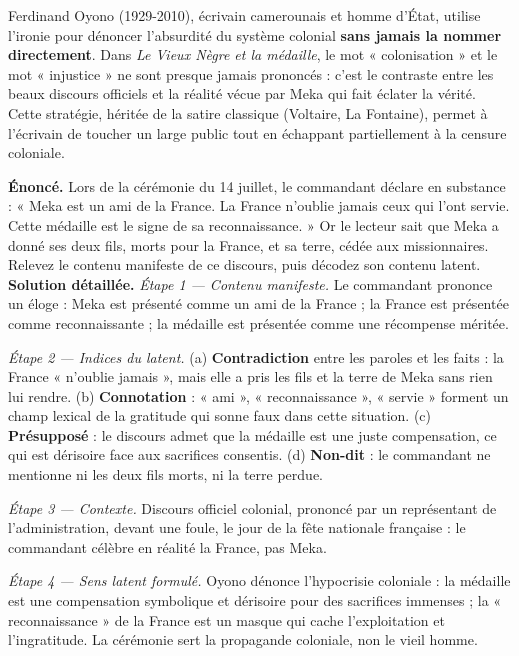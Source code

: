 \documentclass[11pt]{article}
\newcounter{popsec}
\newcounter{popsub}
\newcommand{\courssub}[1]{%
  \stepcounter{popsub}%
  \par\vspace{9pt}\noindent{\popxbold\fontsize{11.5}{13}\selectfont\color{popink}{\color{poporange}\thepopsec.\thepopsub}\hspace{6pt}#1}\par\nopagebreak\vspace{4pt}
}
\begin{document}
\begin{savaistu}
Ferdinand Oyono (1929-2010), écrivain camerounais et homme d'État, utilise l'ironie pour dénoncer l'absurdité du système colonial \textbf{sans jamais la nommer directement}. Dans \emph{Le Vieux Nègre et la médaille}, le mot « colonisation » et le mot « injustice » ne sont presque jamais prononcés : c'est le contraste entre les beaux discours officiels et la réalité vécue par Meka qui fait éclater la vérité. Cette stratégie, héritée de la satire classique (Voltaire, La Fontaine), permet à l'écrivain de toucher un large public tout en échappant partiellement à la censure coloniale.
\end{savaistu}

\courssub{Application : le discours du commandant}

\begin{exoresolu}
\textbf{Énoncé.} Lors de la cérémonie du 14 juillet, le commandant déclare en substance : « Meka est un ami de la France. La France n'oublie jamais ceux qui l'ont servie. Cette médaille est le signe de sa reconnaissance. » Or le lecteur sait que Meka a donné ses deux fils, morts pour la France, et sa terre, cédée aux missionnaires. Relevez le contenu manifeste de ce discours, puis décodez son contenu latent.
\tcblower
\textbf{Solution détaillée.}
\emph{Étape 1 — Contenu manifeste.} Le commandant prononce un éloge : Meka est présenté comme un ami de la France ; la France est présentée comme reconnaissante ; la médaille est présentée comme une récompense méritée.
\par\emph{Étape 2 — Indices du latent.} (a) \textbf{Contradiction} entre les paroles et les faits : la France « n'oublie jamais », mais elle a pris les fils et la terre de Meka sans rien lui rendre. (b) \textbf{Connotation} : « ami », « reconnaissance », « servie » forment un champ lexical de la gratitude qui sonne faux dans cette situation. (c) \textbf{Présupposé} : le discours admet que la médaille est une juste compensation, ce qui est dérisoire face aux sacrifices consentis. (d) \textbf{Non-dit} : le commandant ne mentionne ni les deux fils morts, ni la terre perdue.
\par\emph{Étape 3 — Contexte.} Discours officiel colonial, prononcé par un représentant de l'administration, devant une foule, le jour de la fête nationale française : le commandant célèbre en réalité la France, pas Meka.
\par\emph{Étape 4 — Sens latent formulé.} Oyono dénonce l'hypocrisie coloniale : la médaille est une compensation symbolique et dérisoire pour des sacrifices immenses ; la « reconnaissance » de la France est un masque qui cache l'exploitation et l'ingratitude. La cérémonie sert la propagande coloniale, non le vieil homme.
\end{exoresolu}
\end{document}
